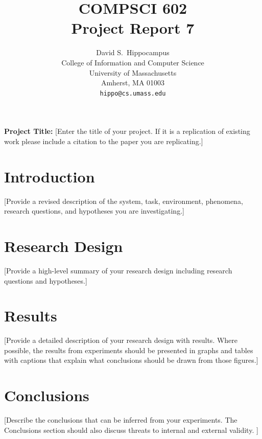 \documentclass{article}
\title{COMPSCI 602 \\ Project Report 7}
\author{%
  David S.~Hippocampus\\
  College of Information and Computer Science\\
  University of Massachusetts\\
  Amherst, MA 01003 \\
  \texttt{hippo@cs.umass.edu}\\
}
\begin{document}
\maketitle


\textbf{Project Title:} [Enter the title of your project. If it is a replication of existing work please include a citation to the paper you are replicating.] 


\section{Introduction}

[Provide a revised description of the system, task, environment, phenomena, research questions, and hypotheses you are investigating.]

\section{Research Design}

[Provide a high-level summary of your research design including research questions and hypotheses.]

\section{Results}

[Provide a detailed description of your research design with results. Where possible, the results from experiments should be presented in graphs and tables with captions that explain what conclusions should be drawn from those figures.]

\section{Conclusions}

[Describe the conclusions that can be inferred from your experiments. The Conclusions section should also discuss threats to internal and external validity. ]




\end{document}
